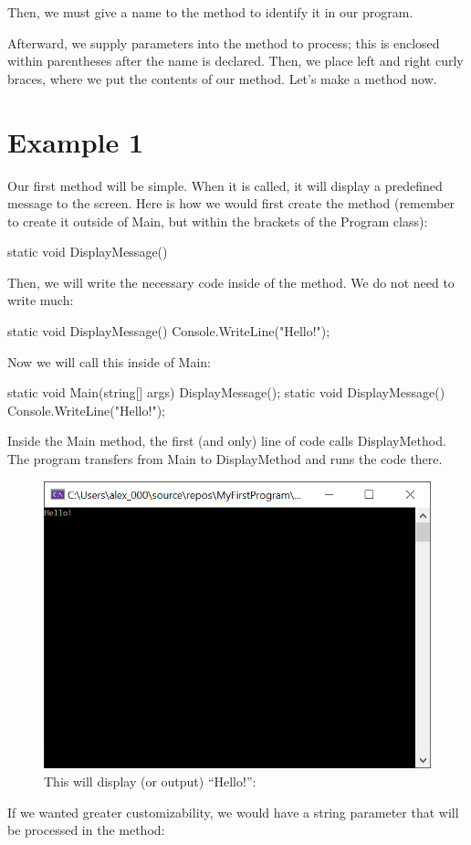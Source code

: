 \documentclass[oneside, openany] {book}
\begin{document}
Then, we must give a name to the method to identify it in our program.

Afterward, we supply parameters into the method to process; this is enclosed within parentheses after the name is declared.
Then, we place left and right curly braces, where we put the contents of our method.
Let’s make a method now.

\section*{Example 1}
Our first method will be simple. When it is called, it will display a predefined message to the screen.
Here is how we would first create the method (remember to create it outside of Main, but within the brackets of the Program class):
\begin{CSharp}
static void DisplayMessage()
{
       
} 
\end{CSharp}

Then, we will write the necessary code inside of the method. We do not need to write much:

\begin{CSharp}
static void DisplayMessage()
{
    Console.WriteLine("Hello!");
}
\end{CSharp}

Now we will call this inside of Main:

\begin{CSharp}
static void Main(string[] args)
{
    DisplayMessage();
}
static void DisplayMessage()
 {
   Console.WriteLine("Hello!");
 }
 \end{CSharp}
 
 Inside the Main method, the first (and only) line of code calls DisplayMethod. The program transfers from Main to DisplayMethod and runs the code there. 
 
 
 \begin{figure}
     \centering
     \includegraphics[scale = 0.5]{MethodHelloWorld}
     \caption{This will display (or output) ``Hello!'':}
     \label{fig:my_label}
 \end{figure}
 If we wanted greater customizability, we would have a string parameter that will be processed in the method:
 
\end{document}
